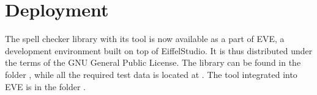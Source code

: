 \documentclass[paper=a4]{scrartcl}
\begin{document}


\section{Deployment}

The spell checker library with its tool is now available as a part of EVE, a development environment built on top of EiffelStudio. It is thus distributed under the terms of the GNU General Public License. The library can be found in the folder , while all the required test data is located at . The tool integrated into EVE is in the folder .
\end{document}
